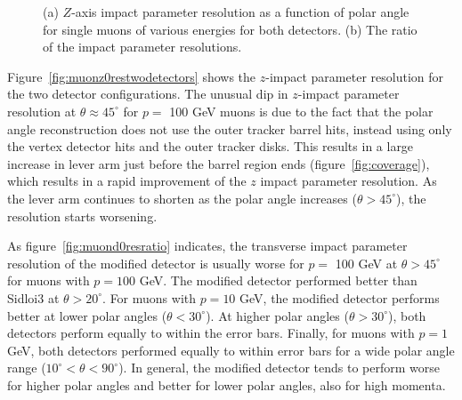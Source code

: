 \begin{figure}[h!]
\begin{minipage}{2.0in}
\label{fig:muonz0resratio}
\end{minipage}
\caption{(a) $Z$-axis impact parameter resolution as a function of polar angle for single muons of various energies for both detectors.
(b) The ratio of the impact parameter resolutions.}
\label{fig:muonz0res}
\end{figure}

Figure~\ref{fig:muonz0restwodetectors} shows the $z$-impact parameter
resolution for the two detector configurations.
The unusual dip in $z$-impact parameter resolution at
$\theta \approx 45^{\circ}$ for $p = $ 100 GeV muons%
is due to the fact that the polar angle reconstruction does not use the outer tracker barrel hits, instead using only the
vertex detector hits and the outer tracker disks.
This results in a large increase in lever arm just before the barrel region ends (figure~\ref{fig:coverage}),
which results in a rapid improvement of the $z$ impact parameter resolution.
As the lever arm continues to shorten as the polar angle increases ($\theta > 45^{\circ}$),
the resolution starts worsening.

As figure~\ref{fig:muond0resratio} indicates, the transverse impact parameter resolution of the modified detector
is usually worse for $p =$ 100 GeV
at $\theta > 45^{\circ}$
for muons with $p = 100$ GeV.%
The modified detector performed better than %
Sidloi3 at $\theta > 20^{\circ}$.
For muons with $p = 10$ GeV, the modified detector performs better at lower polar angles ($\theta < 30^{\circ}$).
At higher polar angles ($\theta > 30^{\circ}$), both detectors perform equally to within the error bars.
Finally, for muons with $p = 1$ GeV, both detectors performed equally to within error bars for a wide polar angle range ($10^{\circ} < \theta < 90^{\circ}$).
In general, the modified detector tends to perform worse for higher polar angles and better for lower polar angles,
also for high momenta.

